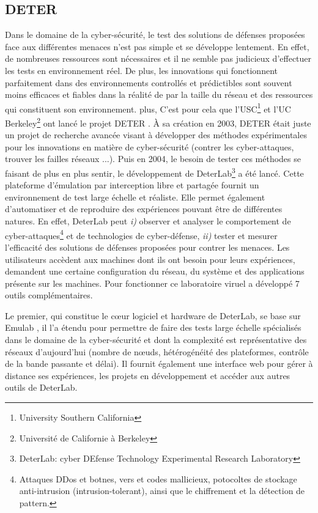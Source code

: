 \subsection{DETER}
\label{subsection:DETER}

Dans le domaine de la cyber-sécurité, le test des solutions de
défenses proposées face aux différentes menaces n'est pas simple et se
développe lentement. En effet, de nombreuses ressources sont
nécessaires et il ne semble pas judicieux d'effectuer les tests en
environnement réel. De plus, les innovations qui fonctionnent
parfaitement dans des environnements controllés et prédictibles sont
souvent moins efficaces et fiables dans la réalité de par la taille du
réseau et des ressources qui constituent son environnement. %
plus,
C'est pour cela que l'USC\footnote{University Southern California} et
l'UC Berkeley\footnote{Université de Californie à Berkeley} ont lancé
le projet DETER \citep{DETER_Project, DETER_benzel2011science,
  DETER_mirkovic2010deter}. À sa création en 2003, DETER était juste
un projet de recherche avancée visant à développer des méthodes
expérimentales pour les innovations en matière de cyber-sécurité
(contrer les cyber-attaques, trouver les failles réseaux ...). Puis en
2004, le besoin de tester ces méthodes se faisant de plus en plus
sentir, le développement de DeterLab\footnote{DeterLab: cyber DEfense
  Technology Experimental Research Laboratory} a été lancé. Cette
plateforme d'émulation par interception libre et partagée fournit
un environnement de test large échelle et réaliste. Elle permet
également d'automatiser et de reproduire des expériences pouvant être
de différentes natures. En effet, DeterLab peut \textit{i)} observer
et analyser le comportement de cyber-attaques\footnote{ Attaques DDos
  et botnes, vers et codes mallicieux, potocoltes de stockage
  anti-intrusion (intrusion-tolerant), ainsi que le chiffrement et la
  détection de pattern.} et de technologies de cyber-défense,
\textit{ii)} tester et mesurer l'efficacité des solutions de défenses
proposées pour contrer les menaces. Les utilisateurs accèdent aux
machines dont ils ont besoin  pour leurs expériences, demandent une
certaine configuration du réseau, du système et des applications
présente sur les machines. Pour fonctionner ce laboratoire viruel a
développé 7 outils complémentaires.

Le premier, qui constitue le c\oe ur logiciel et hardware de DeterLab,
se base sur Emulab \citep{EMULAB_INIT}, il l'a étendu pour permettre
de faire des tests large échelle spécialisés dans le domaine de la
cyber-sécurité et dont la complexité est représentative des réseaux
d'aujourd'hui (nombre de n\oe uds, hétérogénéité des plateformes,
contrôle de la bande passante et délai). Il fournit également une
interface web pour gérer à distance ses expériences, les projets en
développement et accéder aux autres outils de DeterLab.

